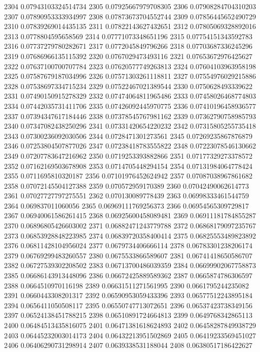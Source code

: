 2304 0.07943103324514734
2305 0.07925667979708305
2306 0.07908284704310203
2307 0.07890953333934997
2308 0.07873673704552744
2309 0.07856445652490729
2310 0.07839269014435135
2311 0.07822143627432651
2312 0.07805069328892016
2313 0.0778804595658569
2314 0.07771073348651196
2315 0.07754151343592783
2316 0.07737279780282671
2317 0.0772045849796266
2318 0.07703687336245296
2319 0.07686966135115392
2320 0.0767029473493116
2321 0.07653672976425627
2322 0.07637100700707784
2323 0.07620577749263813
2324 0.07604103963958198
2325 0.07587679187034996
2326 0.07571303261118811
2327 0.07554976029215886
2328 0.07538697334715234
2329 0.07522467021389544
2330 0.0750628493339622
2331 0.07490150915278329
2332 0.07474064811965486
2333 0.07458026468774803
2334 0.07442035731411706
2335 0.07426092445970775
2336 0.07410196458936577
2337 0.07394347617184446
2338 0.07378545767981162
2339 0.07362790758985793
2340 0.07347082438250296
2341 0.07331420654220232
2342 0.07315805255735418
2343 0.07300236092030506
2344 0.0728471301273561
2345 0.07269235867876879
2346 0.07253804507877026
2347 0.07238418783555822
2348 0.07223078546130662
2349 0.07207783647216962
2350 0.0719253393882866
2351 0.07177329273378572
2352 0.07162169503678908
2353 0.0714705448294154
2354 0.07131984064778424
2355 0.0711695810320187
2356 0.07101976452624942
2357 0.07087038967861682
2358 0.07072145504127388
2359 0.070572959170389
2360 0.07042490062614773
2361 0.07027727797275551
2362 0.070130089778439
2363 0.06998333461544759
2364 0.069837011060056
2365 0.06969111769256373
2366 0.06954565309729817
2367 0.06940061586261415
2368 0.06925600458089481
2369 0.06911181784855287
2370 0.06896805426603002
2371 0.06882471243779788
2372 0.06868179097235767
2373 0.06853928848223985
2374 0.06839720358400414
2375 0.06825553489823892
2376 0.06811428104956024
2377 0.0679734406666114
2378 0.06783301238206174
2379 0.06769299483260557
2380 0.0675533866589607
2381 0.06741418650586707
2382 0.06727539302208502
2383 0.06713700486039359
2384 0.06699902067758873
2385 0.06686143913448096
2386 0.06672425889589362
2387 0.0665874786306597
2388 0.0664510970116198
2389 0.06631511271561995
2390 0.0661795244235082
2391 0.0660443308201317
2392 0.06590953059433396
2393 0.06577512243895184
2394 0.0656411050508117
2395 0.06550747713072651
2396 0.06537423738349156
2397 0.06524138451788215
2398 0.06510891724664813
2399 0.0649768342865113
2400 0.06484513435816075
2401 0.06471381618624893
2402 0.06458287849938729
2403 0.06445232003014173
2404 0.06432213951502869
2405 0.06419233569451027
2406 0.06406290731298914
2407 0.0639338531188044
2408 0.06380517186422627
